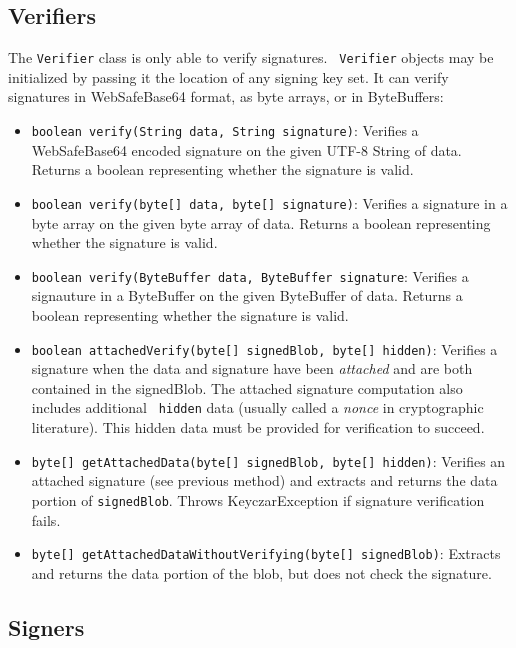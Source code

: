 \documentclass{llncs}
\begin{document}
\subsection{Verifiers}

The {\tt Verifier} class is only able to verify signatures. {\tt
Verifier} objects may be initialized by passing it the location of
any signing key set.  It can verify signatures in WebSafeBase64
format, as byte arrays, or in ByteBuffers:


\begin{itemize}
  \item {\tt boolean verify(String data, String signature)}: Verifies
    a WebSafeBase64 encoded signature on the given UTF-8 String of
    data. Returns a boolean representing whether the signature is
    valid.
  \item {\tt boolean verify(byte[] data, byte[] signature)}: Verifies
    a signature in a byte array on the given byte array of
    data. Returns a boolean representing whether the signature is
    valid.
  \item {\tt boolean verify(ByteBuffer data, ByteBuffer signature}:
    Verifies a signauture in a ByteBuffer on the given ByteBuffer of
    data. Returns a boolean representing whether the signature is
    valid.
  \item {\tt boolean attachedVerify(byte[] signedBlob, byte[] hidden)}:
    Verifies a signature when the data and signature have been
    {\it attached} and are both contained in the signedBlob.  The
    attached signature computation also includes additional {\tt
    hidden} data (usually called a {\it nonce} in cryptographic
    literature).  This hidden data must be provided for verification
    to succeed.
  \item {\tt byte[] getAttachedData(byte[] signedBlob, byte[] hidden)}:
    Verifies an attached signature (see previous method) and extracts
    and returns the data portion of {\tt signedBlob}.  Throws
    KeyczarException if signature verification fails.
  \item {\tt byte[] getAttachedDataWithoutVerifying(byte[]
    signedBlob)}: Extracts and returns the data portion of the blob,
    but does not check the signature.
\end{itemize}

\subsection{Signers}
\end{document}
